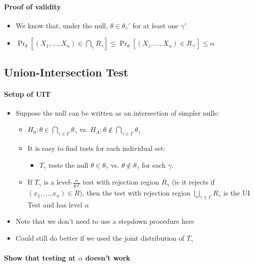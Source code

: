 \paragraph{Proof of validity}
\begin{itemize}
\item We know that, under the null, $\theta \in \theta_\gamma'$ for at least one $\gamma'$
\item $\Pr_\theta[(X_1,\dots,X_n) \in \bigcap_\gamma R_\gamma] \leq \Pr_\theta[(X_1,\dots, X_n) \in R_{\gamma'}] \leq \alpha$
\end{itemize}

\subsection{Union-Intersection Test}

\paragraph{Setup of UIT}
\begin{itemize}
\item Suppose the null can be written as an intersection of simpler
  nulls:
  \begin{itemize}
  \item $H_0: \theta \in \bigcap_{\gamma \in \Gamma} \theta_\gamma$ vs.  $H_A: \theta \notin \bigcap_{\gamma \in \Gamma} \theta_\gamma$
  \item It is easy to find tests for each individual set:
    \begin{itemize}
    \item $T_\gamma$ tests the null $\theta \in \theta_\gamma$ vs. $\theta \notin \theta_\gamma$ for each $\gamma$.
    \end{itemize}
  \item If $T_\gamma$ is a level-$\frac{\alpha}{\# \Gamma}$ test with rejection
    region $R_\gamma$ (ie it rejects if $(x_1,\dots,x_n) \in R$), then the test
    with rejection region $\bigcup_{\gamma \in \Gamma} R_\gamma$ is the UI Test and has level
    $\alpha$
  \end{itemize}
\item Note that we don't need to use a stepdown procedure here
\item Could still do better if we used the joint distribution of $T_\gamma$
\end{itemize}

\paragraph{Show that testing at $\alpha$ doesn't work}

